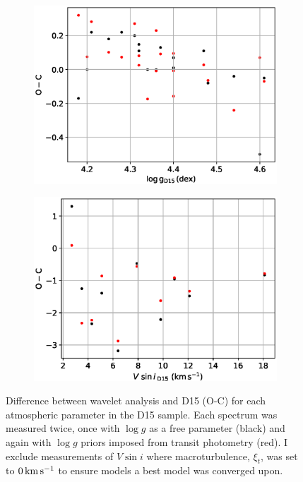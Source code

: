\begin{figure}
\begin{subfigure}[b]{0.5\linewidth}
    \centering
    \includegraphics[width=\linewidth]{5-images/doyleL} 
    \caption{} 
    \label{doyle:c} 
  \end{subfigure}%
  \begin{subfigure}[b]{0.5\linewidth}
    \centering
   \includegraphics[width=\linewidth]{5-images/doyleV} 
    \caption{} 
    \label{doyle:d} 
  \end{subfigure} 
  \caption{Difference between wavelet analysis and D15 (O-C) for each atmospheric parameter in the D15 sample. Each spectrum was measured twice, once with $\log g$ as a free parameter (black) and again with $\log g$ priors imposed from transit photometry (red).  I exclude measurements of $V \sin i$ where macroturbulence, $\xi_t$, was set to $0\,\rm km\,s^{-1}$ to ensure models a best model was converged upon.}
  \label{wavelet:fig:doyle}   
\end{figure}



